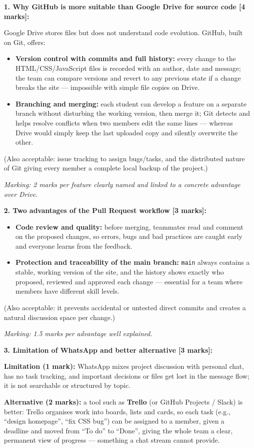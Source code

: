 \documentclass[11pt]{article}
\begin{document}
\begin{corrige}
\textbf{1. Why GitHub is more suitable than Google Drive for source code [4 marks]:}

Google Drive stores files but does not understand code evolution. GitHub, built on Git, offers:
\begin{itemize}
    \item \textbf{Version control with commits and full history:} every change to the HTML/CSS/JavaScript files is recorded with an author, date and message; the team can compare versions and revert to any previous state if a change breaks the site — impossible with simple file copies on Drive.
    \item \textbf{Branching and merging:} each student can develop a feature on a separate branch without disturbing the working version, then merge it; Git detects and helps resolve conflicts when two members edit the same lines — whereas Drive would simply keep the last uploaded copy and silently overwrite the other.
\end{itemize}
(Also acceptable: issue tracking to assign bugs/tasks, and the distributed nature of Git giving every member a complete local backup of the project.)

\emph{Marking: 2 marks per feature clearly named and linked to a concrete advantage over Drive.}

\textbf{2. Two advantages of the Pull Request workflow [3 marks]:}
\begin{itemize}
    \item \textbf{Code review and quality:} before merging, teammates read and comment on the proposed changes, so errors, bugs and bad practices are caught early and everyone learns from the feedback.
    \item \textbf{Protection and traceability of the main branch:} \texttt{main} always contains a stable, working version of the site, and the history shows exactly who proposed, reviewed and approved each change — essential for a team where members have different skill levels.
\end{itemize}
(Also acceptable: it prevents accidental or untested direct commits and creates a natural discussion space per change.)

\emph{Marking: 1.5 marks per advantage well explained.}

\textbf{3. Limitation of WhatsApp and better alternative [3 marks]:}

\textbf{Limitation (1 mark):} WhatsApp mixes project discussion with personal chat, has no task tracking, and important decisions or files get lost in the message flow; it is not searchable or structured by topic.

\textbf{Alternative (2 marks):} a tool such as \textbf{Trello} (or GitHub Projects / Slack) is better: Trello organises work into boards, lists and cards, so each task (e.g., ``design homepage'', ``fix CSS bug'') can be assigned to a member, given a deadline and moved from ``To do'' to ``Done'', giving the whole team a clear, permanent view of progress — something a chat stream cannot provide.
\end{corrige}
\end{document}
